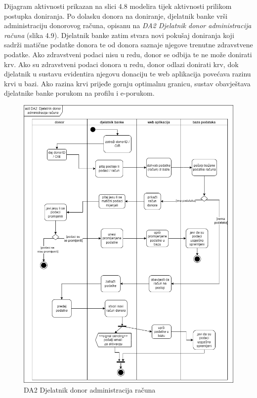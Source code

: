     \par {Dijagram aktivnosti prikazan na slici 4.8 modelira tijek aktivnosti prilikom postupka doniranja.  Po dolasku donora na doniranje, djelatnik banke vrši administraciju donorovog računa, opisanu na \textit{DA2 Djelatnik donor administracija računa} (slika 4.9). Djelatnik banke zatim stvara novi pokušaj doniranja koji sadrži matične podatke donora te od donora saznaje njegove trenutne zdravstvene podatke. Ako zdravstveni podaci nisu u redu, donor se odbija te ne može donirati krv. Ako su zdravstveni podaci donora u redu, donor odlazi donirati krv, dok djelatnik u sustavu evidentira njegovu donaciju te web aplikacija povećava razinu krvi u bazi. Ako razina krvi prijeđe gornju optimalnu granicu, sustav obavještava djelatnike banke porukom na profilu i e-porukom.}
    
    \eject
    
    \begin{figure}[H]
        \includegraphics[scale=0.40]{slike/DA2 Djelatnik donor administracija racuna.png}
    	\centering
    	\caption{DA2 Djelatnik donor administracija računa}
    	\label{fig:da2}
    \end{figure}
    
